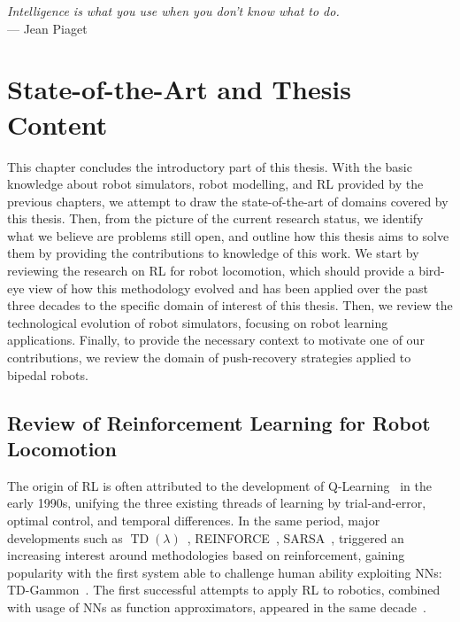 \begin{flushright}
    \textsl{Intelligence is what you use when you don’t know what to do.}\\
    --- Jean Piaget
\end{flushright}

\chapter{State-of-the-Art and Thesis Content}
\label{ch:sota}

This chapter concludes the introductory part of this thesis.
With the basic knowledge about robot simulators, robot modelling, and \ac{RL} provided by the previous chapters, we attempt to draw the state-of-the-art of domains covered by this thesis.
Then, from the picture of the current research status, we identify what we believe are problems still open, and outline how this thesis aims to solve them by providing the contributions to knowledge of this work.
We start by reviewing the research on \ac{RL} for robot locomotion, which should provide a bird-eye view of how this methodology evolved and has been applied over the past three decades to the specific domain of interest of this thesis.
Then, we review the technological evolution of robot simulators, focusing on robot learning applications.
Finally, to provide the necessary context to motivate one of our contributions, we review the domain of push-recovery strategies applied to bipedal robots.

\section{Review of Reinforcement Learning for Robot Locomotion}
\label{sec:review_rl_robot_locomotion}

The origin of \acl{RL} is often attributed to the development of Q-Learning~\parencite{watkins_christopher_learning_1989} in the early 1990s, unifying the three existing threads of learning by trial-and-error, optimal control, and temporal differences.
In the same period, major developments such as $\operatorname{TD}(\lambda)$~\parencite{sutton_learning_1988}, REINFORCE~\parencite{williams_simple_1992}, SARSA~\parencite{rummery_-line_1994}, \etc triggered an increasing interest around methodologies based on reinforcement, gaining popularity with the first system able to challenge human ability exploiting \acp{NN}: TD-Gammon~\parencite{tesauro_td-gammon_1994}.
The first successful attempts to apply \acl{RL} to robotics, combined with usage of \acp{NN} as function approximators, appeared in the same decade~\parencite{lin_reinforcement_1993, gullapalli_acquiring_1994, benbrahim_biped_1997}.

